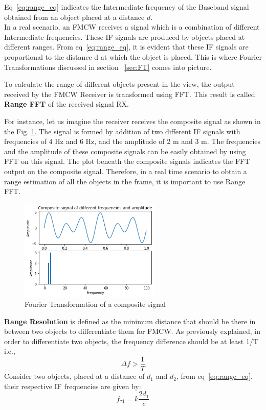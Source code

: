 Eq~\eqref{eq:range_eq} indicates the Intermediate frequency of the Baseband signal obtained from an object placed at a distance \(d\).
\\


In a real scenario, an FMCW receives a signal which is a combination of different Intermediate frequencies. These IF signals are produced by objects placed at different ranges. From eq~\eqref{eq:range_eq}, it is evident that these IF signals are proportional to the distance d at which the object is placed.
This is where Fourier Transformations discussed in section ~\ref{sec:FT} comes into picture.

To calculate the range of different objects present in the view, the output received by the FMCW Receiver is transformed using FFT. This result is called \textbf{Range FFT} of the received signal RX.

For instance, let us imagine the receiver receives the composite signal as shown in the Fig. \ref{fig:comp_fft}. The signal is formed by addition of two different IF signals with frequencies of 4 Hz and 6 Hz, and the amplitude of 2 m and 3 m.
The frequencies and the amplitude of these composite signals can be easily obtained by using FFT on this signal. The plot beneath the composite signals indicates the FFT output on the composite signal.
Therefore, in a real time scenario to obtain a range estimation of all the objects in the frame, it is important to use Range FFT.
 \begin{figure}[ht]
  \begin{center}
    \includegraphics[width=0.6\textwidth]{Master's thesis/images/comp_fft.png} 
    \caption{Fourier Transformation of a composite signal}
    \label{fig:comp_fft}
  \end{center}
\end{figure}  

\textbf{Range Resolution} is defined as the minimum distance that should be there in between two objects to differentiate them for FMCW. As previously explained, in order to differentiate two objects, the frequency difference should be at least 1/T i.e., 
\begin{equation}\label{eq:fgtt}
 \Delta f > \frac{1}{T}  
\end{equation}Consider two objects, placed at a distance of $d_{1}$ and $d_{2}$, from eq~\eqref{eq:range_eq}, their respective IF frequencies are given by:
 \begin{equation}
   f_{\tau1}= k\frac{2d_{1}}{c}
 \end{equation} 
 
